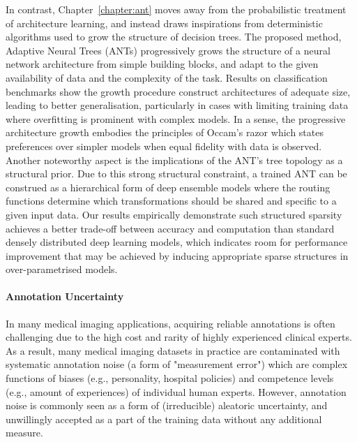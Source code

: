 In contrast, Chapter~\ref{chapter:ant} moves away from the probabilistic treatment of architecture learning, and instead draws inspirations from deterministic algorithms used to grow the structure of decision trees. The proposed method, Adaptive Neural Trees (ANTs) progressively grows the structure of a neural network architecture from simple building blocks, and adapt to the given availability of data and the complexity of the task. Results on classification benchmarks show the growth procedure construct architectures of adequate size, leading to better generalisation, particularly in cases with limiting training data where overfitting is prominent with complex models. In a sense, the progressive architecture growth embodies the principles of Occam's razor \cite{rasmussen2001occam} which states preferences over simpler models when equal fidelity with data is observed. Another noteworthy aspect is the implications of the ANT's tree topology as a structural prior. Due to this strong structural constraint, a trained ANT can be construed as a hierarchical form of deep ensemble models \cite{lakshminarayanan2017simple} where the routing functions determine which transformations should be shared and specific to a given input data. Our results empirically demonstrate such structured sparsity achieves a better trade-off between accuracy and computation than standard densely distributed deep learning models, which indicates room for performance improvement that may be achieved by inducing appropriate sparse structures in over-parametrised models. 

\paragraph{Annotation Uncertainty}
In many medical imaging applications, acquiring reliable annotations is often challenging due to the high cost and rarity of highly experienced clinical experts. As a result, many medical imaging datasets in practice are contaminated with systematic annotation noise (a form of "measurement error") which are complex functions of biases (e.g., personality, hospital policies) and competence levels (e.g., amount of experiences) of individual human experts. However, annotation noise is commonly seen as a form of (irreducible) aleatoric uncertainty, and unwillingly accepted as a part of the training data without any additional measure. 

